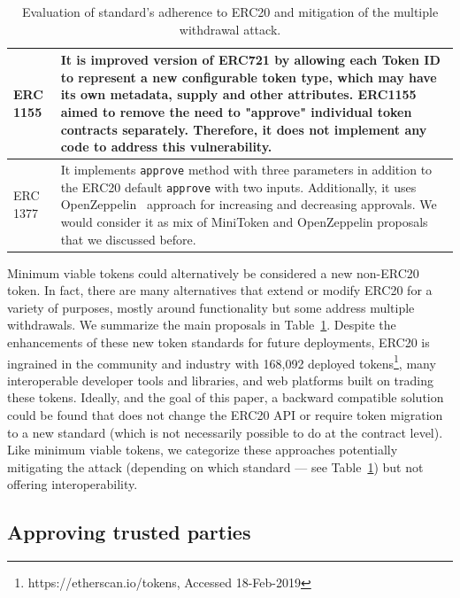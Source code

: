 \begin{table}
\begin{tabular}{|m{1.8cm}|m{14.5cm}|}
	\hline\centering 
	ERC 1155 \cite{Ref25} & It is improved version of ERC721 by allowing each Token ID to represent a new configurable token type, which may have its own metadata, supply and other attributes. ERC1155 aimed to remove the need to "approve" individual token contracts separately. Therefore, it does not implement any code to address this vulnerability.\\ 
	\hline\centering 
	ERC 1377 \cite{Ref26} & It implements \texttt{approve} method with three parameters in addition to the ERC20 default \texttt{approve} with two inputs. Additionally, it uses OpenZeppelin~\cite{Ref10} approach for increasing and decreasing approvals. We would consider it as mix of MiniToken and OpenZeppelin proposals that we discussed before.\\
	\hline
\end{tabular}
\newline
\caption{Evaluation of standard's adherence to ERC20 and mitigation of the multiple withdrawal attack.\label{tab:erc}}
\end{table}

Minimum viable tokens could alternatively be considered a new non-ERC20 token. In fact, there are many alternatives that extend or modify ERC20 for a variety of purposes, mostly around functionality but some address multiple withdrawals. We summarize the main proposals in Table~\ref{tab:erc}. Despite the enhancements of these new token standards for future deployments, ERC20 is ingrained in the community and industry with 168,092 deployed tokens\footnote{https://etherscan.io/tokens, Accessed 18-Feb-2019}, many interoperable developer tools and libraries, and web platforms built on trading these tokens. Ideally, and the goal of this paper, a backward compatible solution could be found that does not change the ERC20 API or require token migration to a new standard (which is not necessarily possible to do at the contract level). Like minimum viable tokens, we categorize these approaches potentially mitigating the attack (depending on which standard --- see Table~\ref{tab:erc}) but not offering interoperability.


\subsection{Approving trusted parties}

